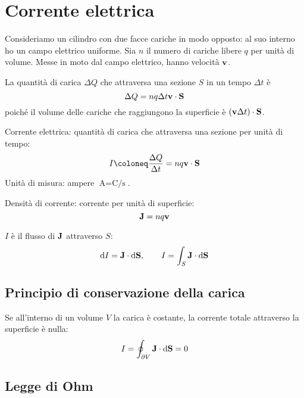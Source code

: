 \section{Corrente elettrica}

Consideriamo un cilindro con due facce cariche in modo opposto: al suo interno ho un campo elettrico uniforme.
Sia $n$ il numero di cariche libere $q$ per unità di volume.
Messe in moto dal campo elettrico, hanno velocità $\mathbf{v}$.


La quantità di carica $\Delta Q$ che attraversa una sezione $S$ in un tempo $\Delta t$ è
\begin{equation}
    \Delta Q = n q \Delta t \mathbf{v} \cdot \mathbf{S}
\end{equation}
poiché il volume delle cariche che raggiungono la superficie è $(\mathbf{v}\Delta t) \cdot \mathbf{S}$.

Corrente elettrica: quantità di carica che attraversa una sezione per unità di tempo:
\begin{equation}
    I \coloneq \frac{\Delta Q}{\Delta t} = nq\vt{v} \cdot \vt{S}
\end{equation}
Unità di misura: ampere $\unit{\ampere} = \unit{\coulomb\per\second}$.

Densità di corrente: corrente per unità di superficie:
\begin{equation}
    \mathbf{J} = nq\mathbf{v}
\end{equation}

$I$ è il flusso di $\mathbf{J}$ attraverso $S$:
\begin{equation}
    \mathrm{d} I = \mathbf{J} \cdot \mathrm{d} \mathbf{S}, \qquad I = \int_S \mathbf{J} \cdot \mathrm{d} \mathbf{S}
\end{equation}

\subsection{Principio di conservazione della carica}

Se all'interno di un volume $V$ la carica è costante, la corrente totale attraverso la superficie è nulla:
\begin{equation}
    I = \oint_{\partial V} \mathbf{J} \cdot \mathrm{d} \mathbf{S} = 0
\end{equation}

\subsection{Legge di Ohm}
\label{sec:legge_ohm}


